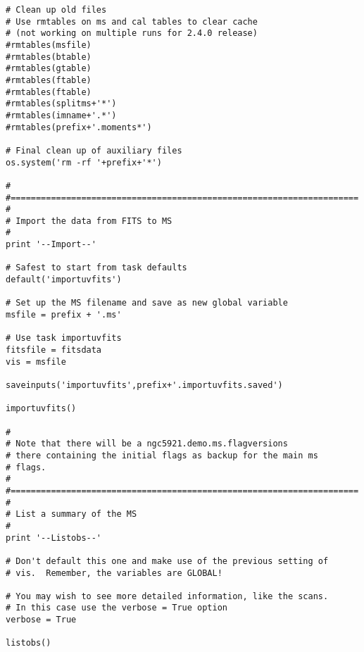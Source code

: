 \begin{verbatim}
# Clean up old files
# Use rmtables on ms and cal tables to clear cache
# (not working on multiple runs for 2.4.0 release)
#rmtables(msfile)
#rmtables(btable)
#rmtables(gtable)
#rmtables(ftable)
#rmtables(ftable)
#rmtables(splitms+'*')
#rmtables(imname+'.*')
#rmtables(prefix+'.moments*')

# Final clean up of auxiliary files
os.system('rm -rf '+prefix+'*')

#
#=====================================================================
#
# Import the data from FITS to MS
#
print '--Import--'

# Safest to start from task defaults
default('importuvfits')

# Set up the MS filename and save as new global variable
msfile = prefix + '.ms'

# Use task importuvfits
fitsfile = fitsdata
vis = msfile

saveinputs('importuvfits',prefix+'.importuvfits.saved')

importuvfits()

#
# Note that there will be a ngc5921.demo.ms.flagversions
# there containing the initial flags as backup for the main ms
# flags.
#
#=====================================================================
#
# List a summary of the MS
#
print '--Listobs--'

# Don't default this one and make use of the previous setting of
# vis.  Remember, the variables are GLOBAL!

# You may wish to see more detailed information, like the scans.
# In this case use the verbose = True option
verbose = True

listobs()


\end{verbatim}
